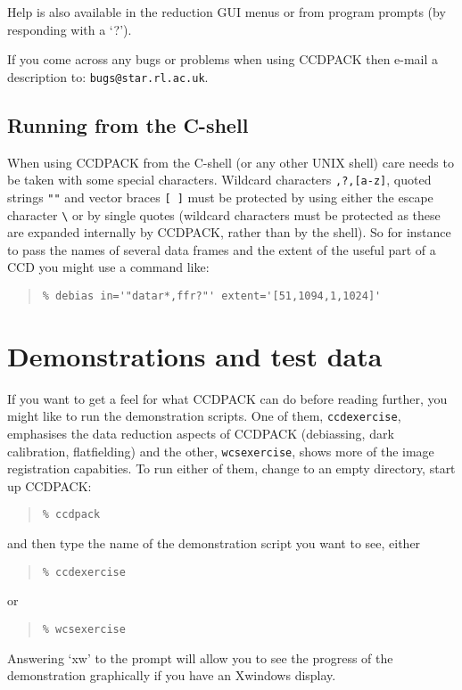 \documentclass[twoside,11pt]{article}
\newcommand{\xlabel}[1]{}
\renewcommand{\_}{\texttt{\symbol{95}}}
\newenvironment{myquote}{\begin{quote}\begin{small}}{\end{small}\end{quote}}
\newcommand{\text}[1]{{\small \tt #1}}
\begin{document}
Help is also available in the reduction GUI menus or from program
prompts (by responding with a `?').

If you come across any bugs or problems when using CCDPACK then e-mail
a description to: \texttt{bugs@star.rl.ac.uk}.

\subsection{Running from the C-shell}
When using CCDPACK from the C-shell (or any other UNIX shell) care needs to
be taken with some special characters.
Wildcard characters \text{*,?,[a-z]}, quoted strings \text{""}
and vector braces \text{[ ]} must be protected by using either the
escape character {\small \verb+\+} or by single quotes (wildcard characters
must be protected as these are expanded internally by CCDPACK, rather than by
the shell).
So for instance to pass the names of several data frames and the extent
of the useful part of a CCD you might use a command like:
\begin{myquote}
\begin{verbatim}
% debias in='"datar*,ffr?"' extent='[51,1094,1,1024]'
\end{verbatim}
\end{myquote}

\section{\xlabel{demos}\label{demos}Demonstrations and test data}

If you want to get a feel for what CCDPACK can do before reading 
further, you might like to run the demonstration scripts.
One of them, {\tt ccdexercise}, 
emphasises the data reduction aspects of CCDPACK 
(debiassing, dark calibration, flatfielding) 
and the other, {\tt wcsexercise}, shows more of the
image registration capabities.  
To run either of them, change to an empty directory,
start up CCDPACK:
\begin{myquote}
\begin{verbatim}
% ccdpack
\end{verbatim}
\end{myquote}
and then type the name of the demonstration script you want to see, 
either
\begin{myquote}
\begin{verbatim}
% ccdexercise
\end{verbatim}
\end{myquote}
or
\begin{myquote}
\begin{verbatim}
% wcsexercise
\end{verbatim}
\end{myquote}
Answering `xw' to the prompt will allow you to see the progress
of the demonstration graphically if you have an Xwindows display.
\end{document}
